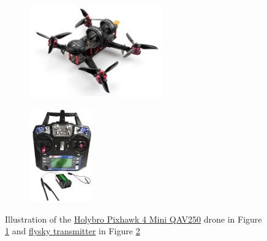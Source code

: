 \documentclass[../Head/report.tex]{subfiles}
\begin{document}
\begin{figure}[H]
    \centering
    \begin{subfigure}[b]{.4\textwidth}
        \centering
        \includegraphics[height=4.0cm]{../Figures/drone/holybro_pixhawk_mini.png}
        \caption{}
        \label{fig:holybro_pixhawk_mini_drone}
    \end{subfigure}
    \begin{subfigure}[b]{.33\textwidth}
        \centering
        \includegraphics[height=4.0cm]{../Figures/drone/flysky_transmitter.png}
        \caption{}
        \label{fig:flysky_transmitter}
    \end{subfigure}
    \caption{Illustration of the \href{https://www.banggood.com/da/Holybro-Pixhawk-4-Mini-QAV250-Basic-Kit-RC-Quadcopter-RC-Drone-W-or-Pixhawk-4-GPS-DR2205-KV2300-Motor-p-1438132.html?utm\_source=googleshopping&utm\_medium=cpc\_organic&gmcCountry=DK&utm\_content=minha&utm\_campaign=minha-dk-da-pc&currency=DKK&cur\_warehouse=CN&createTmp=1&ID=567322&utm\_source=googleshopping&utm\_medium=cpc\_union&utm\_content=sandra&utm\_campaign=sandra-ssc-dk-da-all-0302&ad\_id=337427030565&gclid=CjwKCAjwmv-DBhAMEiwA7xYrd4Bgzi1gPmtia01iAeXnLyVW9CXudMOZ7eQxM53PrTrgx2OHdLvS1hoCdPIQAvD\_BwE}{Holybro Pixhawk 4 Mini QAV250} drone in Figure \ref{fig:holybro_pixhawk_mini_drone} and \href{https://www.banggood.com/FlySky-FS-i6-2\_4G-6CH-AFHDS-Remote-Control-Transmitter-With-FS-R6B-Receiver-For-RC-FPV-Drone-Mode-2-p-1420323.html?utm\_source=googleshopping&utm\_medium=cpc\_organic&gmcCountry=DK&utm\_content=minha&utm\_campaign=minha-dk-en-pc&currency=DKK&cur\_warehouse=CN&createTmp=1&utm\_source=googleshopping&utm\_medium=cpc\_bgs&utm\_content=sandra&utm\_campaign=sandra-ssc-dk-en-all-1105-20bf-11sale&ad\_id=477449337289&gclid=CjwKCAjwmv-DBhAMEiwA7xYrdwTH-q0\_ud-CLZ7CMggdiHnZUga0M4Bhc-nwwN5mUIZsSw1DH_ltyxoCsdoQAvD\_BwE}{flysky transmitter} in Figure \ref{fig:flysky_transmitter}}
    \label{fig:holybro_pixhawk_mini}
\end{figure}
\end{document}
